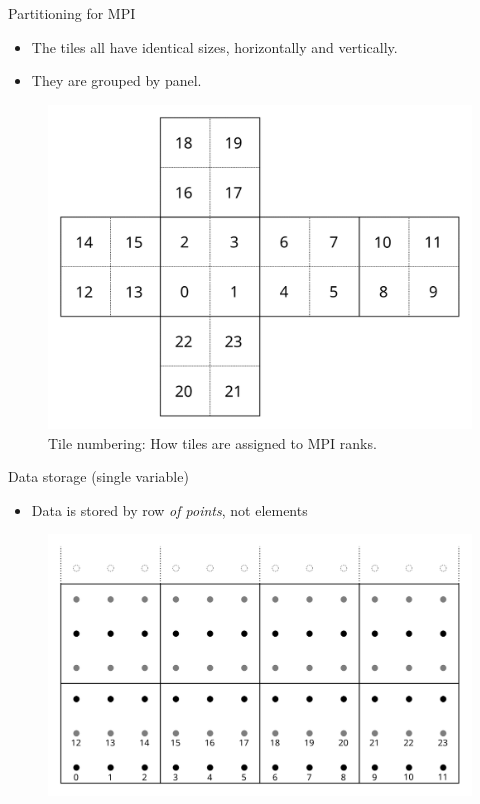 \documentclass{beamer}
\begin{document}
\begin{frame}{Partitioning for MPI}
\begin{itemize}
    \item The tiles all have identical sizes, horizontally and vertically.
    \item They are grouped by panel.
\end{itemize}
\begin{figure}
    \includegraphics[scale=0.6]{img/multi_tile_numbering}
    \caption{Tile numbering: How tiles are assigned to MPI ranks.}
\end{figure}
\end{frame}

\begin{frame}{Data storage (single variable)}
\begin{itemize}
    \item Data is stored by row \emph{of points}, not elements
\end{itemize}
\begin{figure}
    \includegraphics[scale=0.8]{img/variable_storage}
\end{figure}
\end{frame}
\end{document}

